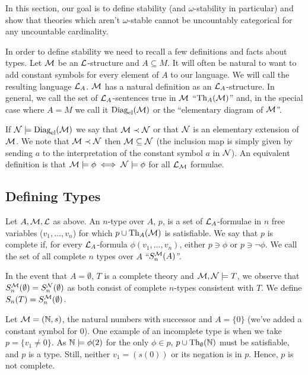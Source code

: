 In this section, our goal is to define stability (and \(\omega\)-stability in particular) and show that theories which aren't \(\omega\)-stable cannot be uncountably categorical for any uncountable cardinality. 

In order to define stability we need to recall a few definitions and facts about types. 
Let \(\mathcal{M}\) be an \(\mathcal{L}\)-structure and \(A \subseteq M\). 
It will often be natural to want to add constant symbols for every element of \(A\) to our language. 
We will call the resulting language \(\mathcal{L}_A\). \(\mathcal{M}\) has a natural definition as an \(\mathcal{L}_A\)-structure. 
In general, we call the set of \(\mathcal{L}_A\)-sentences true in \(\mathcal{M}\) ``\(\text{Th}_A(\mathcal{M})\)'' and, in the special case where \(A = M\) we call it \(\text{Diag}_\text{el}(\mathcal{M})\) or the ``elementary diagram of \(\mathcal{M}\)''. 

If \(\mathcal{N} \models \text{Diag}_\text{el}(\mathcal{M})\) we say that \(\mathcal{M} \prec \mathcal{N}\) or that \(\mathcal{N}\) is an elementary extension of \(\mathcal{M}\). 
We note that \(\mathcal{M} \prec \mathcal{N}\) then \(\mathcal{M} \subseteq \mathcal{N}\) (the inclusion map is simply given by sending \(a\) to the interpretation of the constant symbol \(a\) in \(\mathcal{N}\)).
An equivalent definition is that \(\mathcal{M} \models \phi \iff \mathcal{N} \models \phi\) for all \(\mathcal{L}_{\mathcal{M}}\) formulae. 

\subsection{Defining Types}

\begin{definition}\label{def_types}
Let \(A, \mathcal{M}, \mathcal{L}\) as above. 
An \(n\)-type over \(A\), \(p\), is a set of \(\mathcal{L}_A\)-formulae in \(n\) free variables (\(v_1, \ldots, v_n\)) for which \(p \cup \text{Th}_A(\mathcal{M})\) is satisfiable.
We say that \(p\) is complete if, for every \(\mathcal{L}_A\)-formula \(\phi(v_1, \ldots, v_n)\), either \(p \ni \phi\) or \(p \ni \neg \phi\). 
We call the set of all complete \(n\) types over \(A\) ``\(S_n^{\mathcal{M}}(A)\)''. 

In the event that \(A = \emptyset\), \(T\) is a complete theory and \(\mathcal{M}, \mathcal{N} \models T\), we observe that \(S_n^{\mathcal{M}}(\emptyset) = S_n^{\mathcal{N}}(\emptyset)\) as both consist of complete \(n\)-types consistent with \(T\). 
We define \(S_n(T) = S_n^{\mathcal{M}}(\emptyset)\).
\end{definition}

\begin{example}\label{example_types_natural_numbers} 
Let \(\mathcal{M} = (\mathbb{N},s)\), the natural numbers with successor and \(A = \{0\}\) (we've added a constant symbol for 0). 
One example of an incomplete type is when we take \(p = \{v_1 \neq 0\}\). 
As \(\mathbb{N} \models \phi(2)\) for the only \(\phi \in p\), \(p \cup \text{Th}_\emptyset(\mathbb{N})\) must be satisfiable, and \(p\) is a type. 
Still, neither \(v_1 = (s(0))\) or its negation is in \(p\).
Hence, \(p\) is not complete. 
\end{example}

